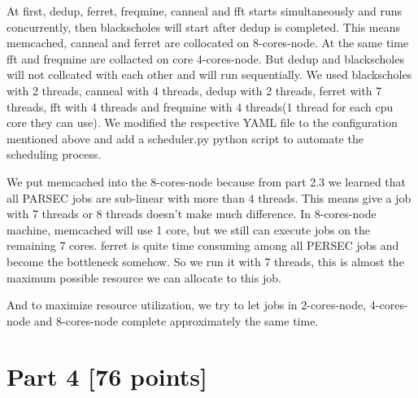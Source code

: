 \documentclass[11pt]{article}
\begin{document}
\begin{enumerate}
    At first, dedup, ferret, freqmine, canneal and fft starts simultaneously and runs concurrently, then blackscholes will start after dedup is completed. 
    This means memcached, canneal and ferret are collocated on 8-cores-node. 
    At the same time fft and freqmine are collacted on core 4-cores-node. 
    But dedup and blackscholes will not collcated with each other and will run sequentially. 
    We used blackscholes with 2 threads, canneal with 4 threads, dedup with 2 threads, ferret with 7 threads, fft with 4 threads and freqmine with 4 threads(1 thread for each cpu core they can use). 
    We modified the respective YAML file to the configuration mentioned above and add a scheduler.py python script to automate the scheduling process.
    
    We put memcached into the 8-cores-node because from part 2.3 we learned that all PARSEC jobs are sub-linear with more than 4 threads. This means give a job with 7 threads or 8 threads doesn't make much difference. In 8-cores-node machine, memcached will use 1 core, but we still can execute jobs on the remaining 7 cores. ferret is quite time consuming among all PERSEC jobs and become the bottleneck somehow. So we run it with 7 threads, this is almost the maximum possible resource we can allocate to this job.
    
    And to maximize resource utilization, we try to let jobs in 2-cores-node, 4-cores-node and 8-cores-node complete approximately the same time.
    
\end{enumerate}

\newpage

\section*{Part 4 [76 points]}
\end{document}
